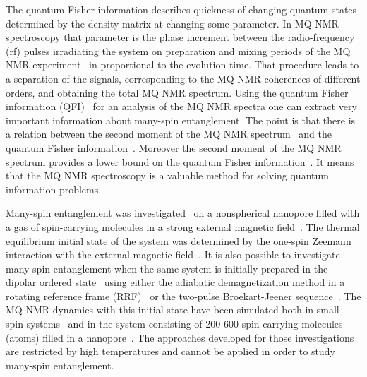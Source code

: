 \documentclass[review]{elsarticle}
\begin{document}
The quantum Fisher information describes quickness of changing quantum states determined by the density matrix at changing some parameter. 
In MQ NMR spectroscopy that parameter is the phase increment between the radio-frequency (rf) pulses irradiating the system on preparation and mixing periods of the MQ NMR experiment~\cite{Baum_1985} in proportional to the evolution time.
That procedure leads to a separation of the signals,
corresponding to the MQ NMR coherences of different orders, and obtaining the total MQ NMR spectrum.
Using the quantum Fisher information (QFI)~\cite{Liu_2014} for an analysis of the MQ NMR spectra one can extract very important information about many-spin entanglement.
The point is that there is a relation between the second moment of the MQ NMR spectrum~\cite{Khitrin_1997} and the quantum Fisher information~\cite{G_rttner_2018,Doronin_2019}.
Moreover the second moment of the MQ NMR spectrum provides a lower bound on the quantum Fisher information~\cite{G_rttner_2018}.
It means that the MQ NMR spectroscopy is a valuable method for solving quantum information problems.

Many-spin entanglement was investigated~\cite{Doronin_2019} on a nonspherical nanopore filled with a gas of spin-carrying molecules in a strong external magnetic field~\cite{Baugh_2001,Doronin_2009}.
The thermal equilibrium initial state of the system was determined by the one-spin Zeemann interaction with the external magnetic field~\cite{Doronin_2007a}.
It is also possible to investigate many-spin entanglement when the same system is initially prepared in the dipolar ordered state~\cite{Goldman_1970} using either the adiabatic demagnetization method in a rotating reference frame (RRF)~\cite{Goldman_1970,Slichter_1961} or the two-pulse Broekart-Jeener sequence~\cite{Goldman_1970,Jeener_1967}.
The MQ NMR dynamics with this initial state have been simulated both in small spin-systems~\cite{Doronin_2007a,Doronin_2007b} and in the system consisting of 200-600 spin-carrying molecules (atoms) filled in a nanopore~\cite{Doronin_2011}.
The approaches developed for those investigations are restricted by high temperatures and cannot be applied in order to study many-spin entanglement.
\end{document}
